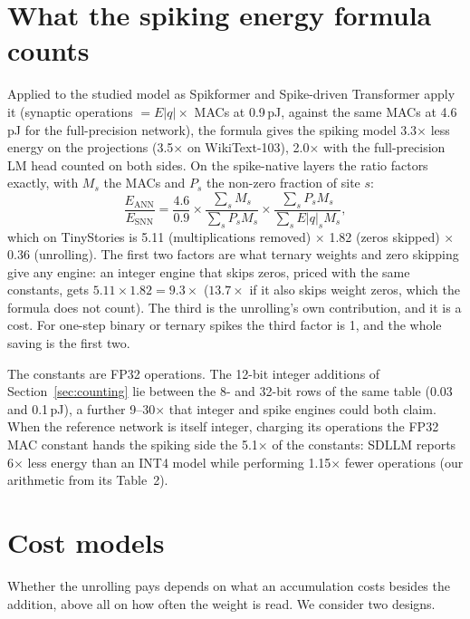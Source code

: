 \documentclass[11pt]{article}
\newcommand{\x}{$\times$}
\begin{document}
\section{What the spiking energy formula counts}
\label{sec:formula}

Applied to the studied model as Spikformer and Spike-driven Transformer apply it (synaptic
operations $= E|q| \times$ MACs at 0.9\,pJ, against the same MACs at 4.6\,pJ for the
full-precision network), the formula gives the spiking model 3.3\x{} less energy on the
projections (3.5\x{} on WikiText-103), 2.0\x{} with the full-precision LM head counted on both
sides. On the spike-native layers the ratio factors exactly, with $M_s$ the MACs and $P_s$ the
non-zero fraction of site $s$:
\begin{equation}
\frac{E_{\mathrm{ANN}}}{E_{\mathrm{SNN}}}
= \frac{4.6}{0.9} \times \frac{\sum_s M_s}{\sum_s P_s M_s}
\times \frac{\sum_s P_s M_s}{\sum_s E|q|_s M_s},
\end{equation}
which on TinyStories is 5.11 (multiplications removed) \x{} 1.82 (zeros skipped) \x{} 0.36
(unrolling). The first two factors are what ternary weights and zero skipping give any engine:
an integer engine that skips zeros, priced with the same constants, gets
$5.11 \times 1.82 = 9.3\times$ ($13.7\times$ if it also skips weight zeros, which the formula
does not count). The third is the unrolling's own contribution, and it is a cost. For one-step
binary or ternary spikes the third factor is 1, and the whole saving is the first two.

The constants are FP32 operations. The 12-bit integer additions of Section~\ref{sec:counting}
lie between the 8- and 32-bit rows of the same table (0.03 and 0.1\,pJ), a further 9--30\x{}
that integer and spike engines could both claim. When the reference network is itself integer,
charging its operations the FP32 MAC constant hands the spiking side the 5.1\x{} of the
constants: SDLLM reports 6\x{} less energy than an INT4 model while performing 1.15\x{} fewer
operations (our arithmetic from its Table~2).

\section{Cost models}
\label{sec:cost}

Whether the unrolling pays depends on what an accumulation costs besides the addition, above all
on how often the weight is read. We consider two designs.
\end{document}
